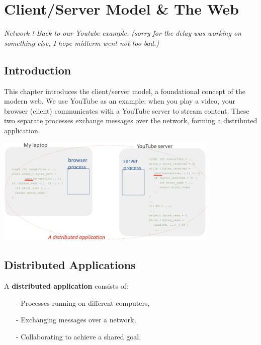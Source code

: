 \documentclass[../../compsys.tex]{subfiles}
\begin{document}
\chapter{Client/Server Model \& The Web}
\textit{Network ! Back to our Youtube example. (sorry for the delay was working on something else, I hope midterm went not too bad.)}\\
\vfill
\section*{Introduction}
This chapter introduces the client/server model, a foundational concept of the modern web. We use YouTube as an example: when you play a video, your browser (client) communicates with a YouTube server to stream content. These two separate processes exchange messages over the network, forming a distributed application.

\begin{center}
    \includegraphics[width=0.8\textwidth]{images/youtube.png}
\end{center}

\section{Distributed Applications}
A \textbf{distributed application} consists of:
\begin{itemize}
    \item[-] Processes running on different computers,
    \item[-] Exchanging messages over a network,
    \item[-] Collaborating to achieve a shared goal.
\end{itemize}
\newpage
\end{document}
